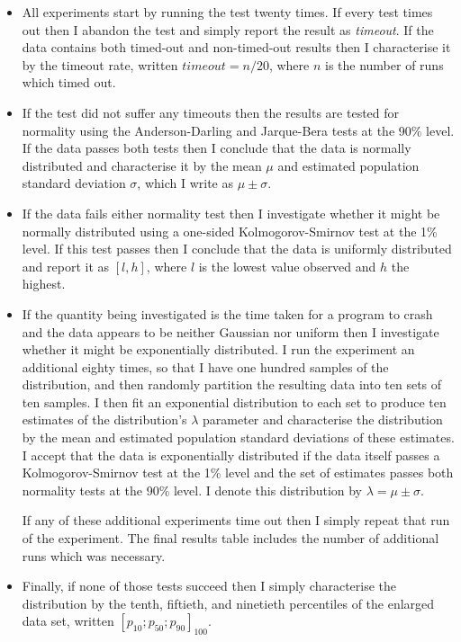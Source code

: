 \begin{itemize}
\item All experiments start by running the test twenty times.  If
  every test times out then I abandon the test and simply report the
  result as \textit{timeout}.  If the data contains both timed-out and
  non-timed-out results then I characterise it by the timeout rate,
  written $timeout = n/20$, where $n$ is the number of runs which
  timed out.
\item If the test did not suffer any timeouts then the results are
  tested for normality using the Anderson-Darling and Jarque-Bera
  tests at the 90\% level.  If the data passes both tests then I
  conclude that the data is normally distributed and characterise it
  by the mean $\mu$ and estimated population standard deviation
  $\sigma$, which I write as $\mu \pm \sigma$.
\item If the data fails either normality test then I investigate
  whether it might be normally distributed using a one-sided
  Kolmogorov-Smirnov test at the 1\% level.  If this test passes then I conclude that the
  data is uniformly distributed and report it as $[l, h]$, where $l$
  is the lowest value observed and $h$ the highest.
\item If the quantity being investigated is the time taken for a
  program to crash and the data appears to be neither Gaussian nor
  uniform then I investigate whether it might be exponentially
  distributed.  I run the experiment an additional eighty times, so
  that I have one hundred samples of the distribution, and then
  randomly partition the resulting data into ten sets of ten samples.
  I then fit an exponential distribution to each set to produce ten
  estimates of the distribution's $\lambda$ parameter and characterise
  the distribution by the mean and estimated population standard
  deviations of these estimates.  I accept that the data is
  exponentially distributed if the data itself passes a
  Kolmogorov-Smirnov test at the 1\% level and the set of estimates
  passes both normality tests at the 90\% level.  I denote this
  distribution by $\lambda = \mu \pm \sigma$.

  If any of these additional experiments time out then I simply repeat
  that run of the experiment.  The final results table includes the
  number of additional runs which was necessary.

\item Finally, if none of those tests succeed then I simply
  characterise the distribution by the tenth, fiftieth, and ninetieth
  percentiles of the enlarged data set, written $[p_{10}; p_{50};
    p_{90}]_{100}$.
\end{itemize}

